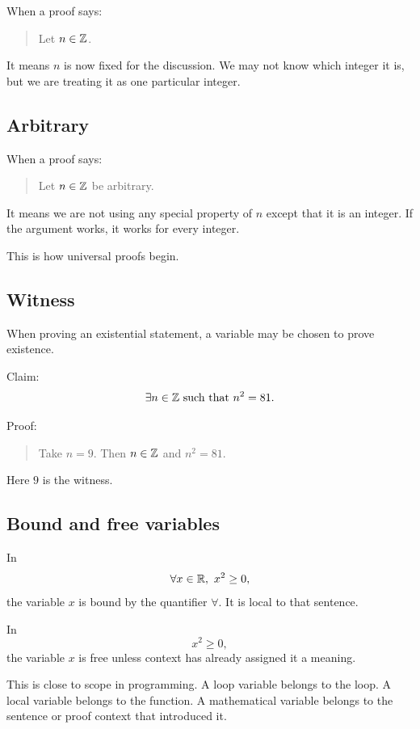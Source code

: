 \documentclass[11pt]{article}
\begin{document}
When a proof says:

\begin{quote}
Let $n\in\mathbb{Z}$.
\end{quote}

It means $n$ is now fixed for the discussion. We may not know which integer it is, but we are treating it as one particular integer.

\subsection{Arbitrary}

When a proof says:

\begin{quote}
Let $n\in\mathbb{Z}$ be arbitrary.
\end{quote}

It means we are not using any special property of $n$ except that it is an integer. If the argument works, it works for every integer.

This is how universal proofs begin.

\subsection{Witness}

When proving an existential statement, a variable may be chosen to prove existence.

Claim:
\[
\exists n\in\mathbb{Z} \text{ such that } n^2=81.
\]

Proof:

\begin{quote}
Take $n=9$. Then $n\in\mathbb{Z}$ and $n^2=81$.
\end{quote}

Here $9$ is the witness.

\subsection{Bound and free variables}

In
\[
\forall x\in\mathbb{R},\ x^2\geq 0,
\]
the variable $x$ is bound by the quantifier $\forall$. It is local to that sentence.

In
\[
x^2\geq 0,
\]
the variable $x$ is free unless context has already assigned it a meaning.

This is close to scope in programming. A loop variable belongs to the loop. A local variable belongs to the function. A mathematical variable belongs to the sentence or proof context that introduced it.
\end{document}
